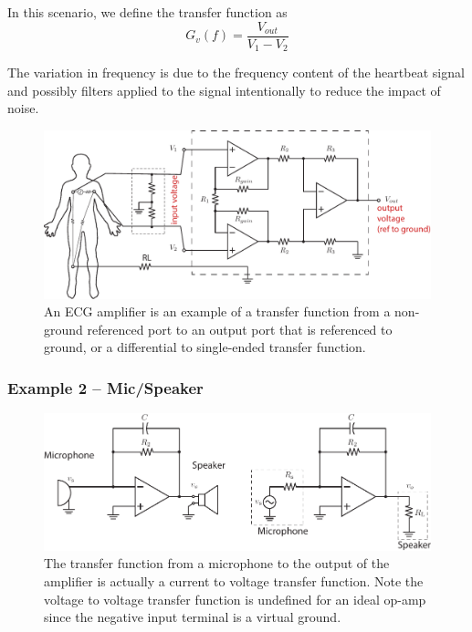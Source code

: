 In this scenario, we define the transfer function as
\begin{equation}
     G_v(f) = \frac{V_{out}}{V_1 - V_2 }
\end{equation}

The variation in frequency is due to the frequency content of the heartbeat signal and possibly filters applied to the signal intentionally to reduce the impact of noise.

\begin{figure}[tb]
\begin{center}
\includegraphics[width=.95\columnwidth]{ex_opamp-ia2}
\end{center}
\caption{An ECG amplifier is an example of a transfer function from a non-ground referenced port to an output port that is referenced to ground, or a differential to single-ended transfer function.} \label{fig:ecg}
\end{figure}




\subsubsection{Example 2 – Mic/Speaker}

\begin{figure}[tb]
\begin{center}
\includegraphics[width=\columnwidth]{ex_microphone}
\end{center}
\caption{The transfer function from a microphone to the output of the amplifier is actually a current to voltage transfer function.  Note the voltage to voltage transfer function is undefined for an ideal op-amp since the negative input terminal is a virtual ground.} \label{fig:microphone}
\end{figure}


